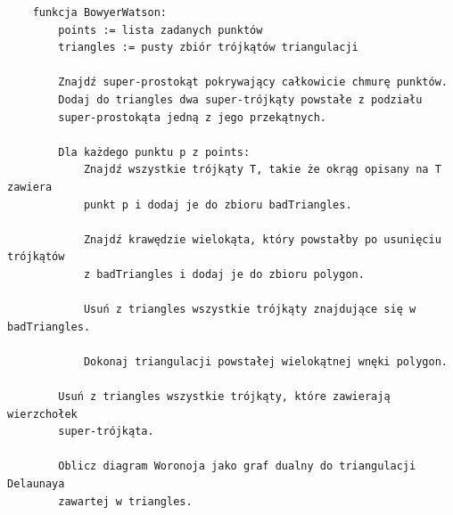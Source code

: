 \documentclass{myclass}
\begin{document}
\begin{small}
\begin{verbatim}
    funkcja BowyerWatson:
        points := lista zadanych punktów
        triangles := pusty zbiór trójkątów triangulacji
        
        Znajdź super-prostokąt pokrywający całkowicie chmurę punktów.
        Dodaj do triangles dwa super-trójkąty powstałe z podziału 
        super-prostokąta jedną z jego przekątnych.
        
        Dla każdego punktu p z points:
            Znajdź wszystkie trójkąty T, takie że okrąg opisany na T zawiera 
            punkt p i dodaj je do zbioru badTriangles.
            
            Znajdź krawędzie wielokąta, który powstałby po usunięciu trójkątów 
            z badTriangles i dodaj je do zbioru polygon.
            
            Usuń z triangles wszystkie trójkąty znajdujące się w badTriangles.
            
            Dokonaj triangulacji powstałej wielokątnej wnęki polygon.
        
        Usuń z triangles wszystkie trójkąty, które zawierają wierzchołek 
        super-trójkąta.
        
        Oblicz diagram Woronoja jako graf dualny do triangulacji Delaunaya 
        zawartej w triangles.
\end{verbatim}
\end{small}
\end{document}

